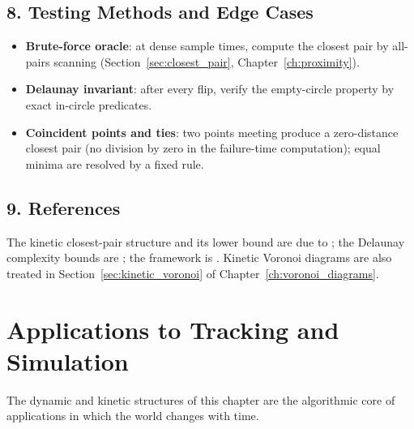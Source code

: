 \subsection{8. Testing Methods and Edge Cases}

\begin{itemize}
  \item \textbf{Brute-force oracle}: at dense sample times, compute the
    closest pair by all-pairs scanning (Section~\ref{sec:closest_pair},
    Chapter~\ref{ch:proximity}).
  \item \textbf{Delaunay invariant}: after every flip, verify the
    empty-circle property by exact in-circle predicates.
  \item \textbf{Coincident points and ties}: two points meeting produce a
    zero-distance closest pair (no division by zero in the failure-time
    computation); equal minima are resolved by a fixed rule.
\end{itemize}

\subsection{9. References}

The kinetic closest-pair structure and its lower bound are due to
\cite{basch1997proximity}; the Delaunay complexity bounds are
\cite{albers1998,rubin2016}; the framework is \cite{basch1999,guibas1998}.
Kinetic Voronoi diagrams are also treated in Section~\ref{sec:kinetic_voronoi}
of Chapter~\ref{ch:voronoi_diagrams}.

\section{Applications to Tracking and Simulation}
\label{sec:dynamic_applications}

The dynamic and kinetic structures of this chapter are the algorithmic core
of applications in which the world changes with time.

